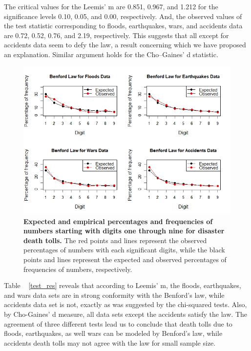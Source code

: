The critical values for the Leemis' m are 0.851, 0.967, and 1.212 for the significance levels 0.10, 0.05, and 0.00, respectively. And, the observed values of the test statistic corresponding to floods, earthquakes, wars, and accidents data are 0.72, 0.52, 0.76, and 2.19, respectively. This suggests that all except for accidents data seem to defy the law, a result concerning which we have proposed an explanation. Similar argument holds for the Cho–Gaines' d statistic. 

\begin{figure}[htbp]
  \centering
  \includegraphics[width=0.70 \paperwidth]{ben_res}
  \caption{\textbf {Expected and empirical percentages and frequencies of numbers starting with digits one through nine for disaster death tolls.} The red points and lines represent the observed percentages of numbers with each significant digits, while the black points and lines represent the expected and observed percentages of frequencies of numbers, respectively.}
  \label{ben_res}
\end{figure}

Table ~ \ref{test_res} reveals that according to Leemis’ m, the floods, earthquakes, and wars data sets are in strong conformity with the Benford’s law, while accidents data set is not, exactly as was suggested by the chi-squared tests. Also, by Cho-Gaines’ d measure, all data sets except the accidents satisfy the law. The agreement of three different tests lead us to conclude that death tolls due to floods, earthquakes, as well wars can be modeled by Benford’s law, while accidents death tolls may not agree with the law for small sample size. 

